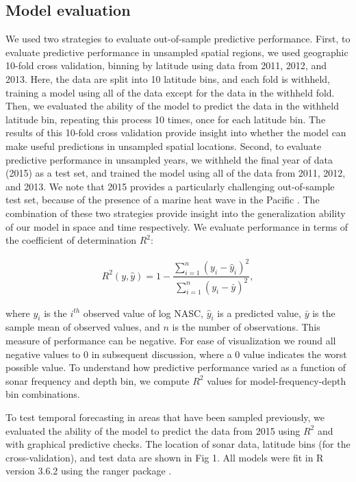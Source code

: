 \documentclass[10pt,letterpaper]{article}
\begin{document}
\subsection*{Model evaluation}

We used two strategies to evaluate out-of-sample predictive performance. 
First, to evaluate predictive performance in unsampled spatial regions, we used geographic 10-fold cross validation, binning by latitude using data from 2011, 2012, and 2013. 
Here, the data are split into 10 latitude bins, and each fold is withheld, training a model using all of the data except for the data in the withheld fold. 
Then, we evaluated the ability of the model to predict the data in the withheld latitude bin, repeating this process 10 times, once for each latitude bin. 
The results of this 10-fold cross validation provide insight into whether the model can make useful predictions in unsampled spatial locations. 
Second, to evaluate predictive performance in unsampled years, we withheld the final year of data (2015) as a test set, and trained the model using all of the data from 2011, 2012, and 2013. 
We note that 2015 provides a particularly challenging out-of-sample test set, because of the presence of a marine heat wave in the Pacific \cite{di2016multi}.
The combination of these two strategies provide insight into the generalization ability of our model in space and time respectively.
We evaluate performance in terms of the coefficient of determination $R^2$: 

\begin{gather*}
R^2(y, \hat{y}) = 1 - \dfrac{\sum_{i = 1}^n (y_i - \hat{y}_i)^2}{\sum_{i = 1}^n (y_i - \bar{y})^2},
\end{gather*}

where $y_i$ is the $i^{th}$ observed value of log NASC, $\hat{y}_i$ is a predicted value, $\bar{y}$ is the sample mean of observed values, and $n$ is the number of observations. 
This measure of performance can be negative. 
For ease of visualization we round all negative values to 0 in subsequent discussion, where a 0 value indicates the worst possible value.
To understand how predictive performance varied as a function of sonar frequency and depth bin, we compute $R^2$ values for model-frequency-depth bin combinations.

To test temporal forecasting in areas that have been sampled previously, we  evaluated the ability of the model to predict the data from 2015 using $R^2$ and with graphical predictive checks.
The location of sonar data, latitude bins (for the cross-validation), and test data are shown in Fig 1.
All models were fit in R version 3.6.2 using the ranger package \cite{ranger,rcore}.
\end{document}

